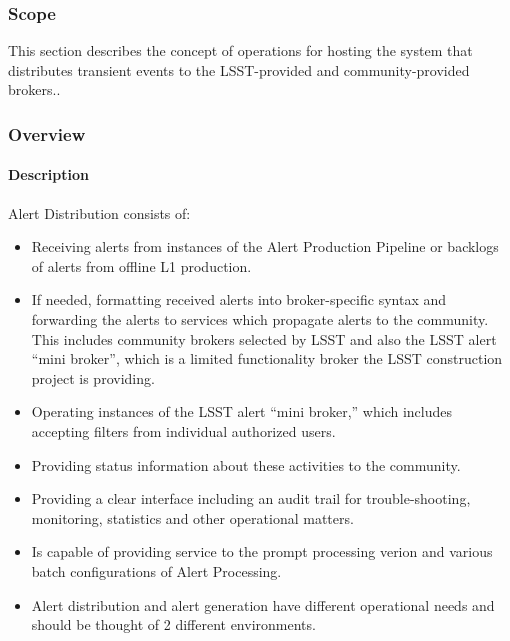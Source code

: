 \subsubsection{Scope}
This section describes the concept of operations for hosting the system that distributes transient events to the LSST-provided and community-provided brokers..

\subsubsection{Overview}

\paragraph{Description}

Alert Distribution consists of:
\begin{itemize}

\item Receiving alerts from instances of the Alert Production Pipeline or backlogs of alerts from offline L1 production.

\item If needed, formatting received alerts into broker-specific syntax and forwarding the alerts to services which propagate alerts to the community. This includes  community brokers selected by LSST and also  the LSST alert “mini broker”, which is a limited functionality broker the LSST construction project is providing.

\item Operating instances of the LSST alert “mini broker,” which includes accepting filters from individual authorized users.

\item Providing status information about these activities to the community.

\item Providing a clear interface including an audit trail for trouble-shooting, monitoring, statistics and other operational matters.

\item Is capable of providing service to the prompt processing verion and various batch configurations of Alert Processing.
\item Alert distribution and alert generation have different operational needs and should be thought of 2 different environments.   

\end{itemize}

